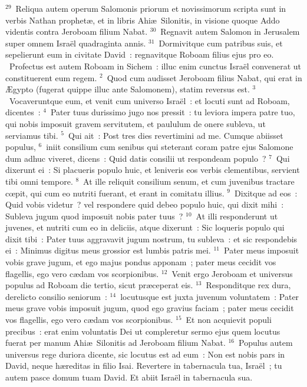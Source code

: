 ${}^{29}$~Reliqua autem operum Salomonis priorum et novissimorum scripta sunt in verbis Nathan prophet\ae , et in libris Ahi\ae\ Silonitis, in visione quoque Addo videntis contra Jeroboam filium Nabat.
${}^{30}$~Regnavit autem Salomon in Jerusalem super omnem Isra\"el quadraginta annis.
${}^{31}$~Dormivitque cum patribus suis, et sepelierunt eum in civitate David~: regnavitque Roboam filius ejus pro eo.
~\lettrine[lines=10,image=true,loversize=0.05,lraise=-0.03]{P}{}rofectus est autem Roboam in Sichem~: illuc enim cunctus Isra\"el convenerat ut constituerent eum regem.
${}^{2}$~Quod cum audisset Jeroboam filius Nabat, qui erat in \AE gypto (fugerat quippe illuc ante Salomonem), statim reversus est.
${}^{3}$~Vocaveruntque eum, et venit cum universo Isra\"el~: et locuti sunt ad Roboam, dicentes~:
${}^{4}$~Pater tuus durissimo jugo nos pressit~: tu leviora impera patre tuo, qui nobis imposuit gravem servitutem, et paululum de onere subleva, ut serviamus tibi.
${}^{5}$~Qui ait~: Post tres dies revertimini ad me. Cumque abiisset populus,
${}^{6}$~iniit consilium cum senibus qui steterant coram patre ejus Salomone dum adhuc viveret, dicens~: Quid datis consilii ut respondeam populo~?
${}^{7}$~Qui dixerunt ei~: Si placueris populo huic, et leniveris eos verbis clementibus, servient tibi omni tempore.
${}^{8}$~At ille reliquit consilium senum, et cum juvenibus tractare cœpit, qui cum eo nutriti fuerant, et erant in comitatu illius.
${}^{9}$~Dixitque ad eos~: Quid vobis videtur~? vel respondere quid debeo populo huic, qui dixit mihi~: Subleva jugum quod imposuit nobis pater tuus~?
${}^{10}$~At illi responderunt ut juvenes, et nutriti cum eo in deliciis, atque dixerunt~: Sic loqueris populo qui dixit tibi~: Pater tuus aggravavit jugum nostrum, tu subleva~: et sic respondebis ei~: Minimus digitus meus grossior est lumbis patris mei.
${}^{11}$~Pater meus imposuit vobis grave jugum, et ego majus pondus apponam~; pater meus cecidit vos flagellis, ego vero c\ae dam vos scorpionibus.
${}^{12}$~Venit ergo Jeroboam et universus populus ad Roboam die tertio, sicut pr\ae ceperat eis.
${}^{13}$~Responditque rex dura, derelicto consilio seniorum~:
${}^{14}$~locutusque est juxta juvenum voluntatem~: Pater meus grave vobis imposuit jugum, quod ego gravius faciam~; pater meus cecidit vos flagellis, ego vero c\ae dam vos scorpionibus.
${}^{15}$~Et non acquievit populi precibus~: erat enim voluntatis Dei ut compleretur sermo ejus quem locutus fuerat per manum Ahi\ae\ Silonitis ad Jeroboam filium Nabat.
${}^{16}$~Populus autem universus rege duriora dicente, sic locutus est ad eum~: Non est nobis pars in David, neque h\ae reditas in filio Isai. Revertere in tabernacula tua, Isra\"el~; tu autem pasce domum tuam David. Et abiit Isra\"el in tabernacula sua.
